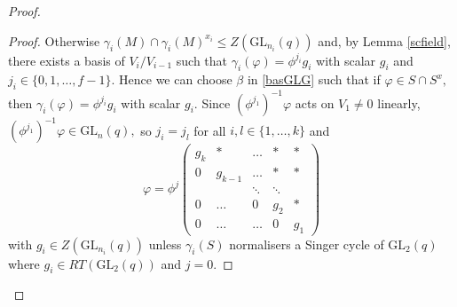 \documentclass[a4paper,reqno,11pt]{amsart}
\theoremstyle{definition}
\theoremstyle{remark}
\numberwithin{equation}{section}
\newcommand{\GL}{{\mathrm{GL}}}
\begin{document}
\begin{proof}
\begin{proof}
     Otherwise $\gamma_i(M) \cap \gamma_i(M)^{x_i} \le Z(\GL_{n_i}(q))$ and, by Lemma \ref{scfield}, there exists a basis of $V_i/V_{i-1}$ such that $\gamma_i(\varphi)= \phi^{j_i} g_i$ with scalar $g_i$ and $j_i \in \{0,1, \ldots , f-1 \}.$ Hence we can choose $\beta$ in \eqref{basGLG} such that if $\varphi \in S \cap S^x,$ then $\gamma_i(\varphi)= \phi^{j_i} g_i$ with scalar $g_i.$ Since $(\phi^{j_1})^{-1} \varphi$ acts on $V_1\ne 0$ linearly,   $(\phi^{j_1})^{-1} \varphi \in \GL_n(q),$ so $j_i=j_l$ for all $i,l \in \{1, \ldots, k\}$
and 
\begin{equation}
\label{phitri}
\varphi = \phi^j 
\begin{pmatrix}
g_k     & * & \ldots & * & * \\
0          &    g_{k-1}  & \ldots & * & * \\
     &     & \ddots & \ddots  &    \\
   0    &    \ldots& 0 & g_{2} & * \\
      0    &   \ldots        & \ldots& 0 & g_{1}
\end{pmatrix}
\end{equation}
 with $g_i \in Z(\GL_{n_i}(q))$ unless $\gamma_i(S)$ normalisers a Singer cycle of $\GL_2(q)$  where $g_i \in RT(\GL_2(q))$ and $j=0$.




\end{proof}
\end{proof}
\end{document}

